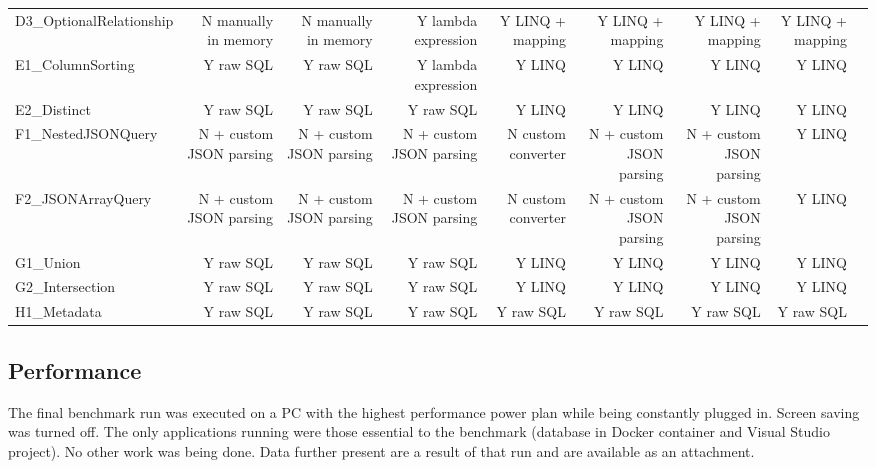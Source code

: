 \begin{landscape}
\begin{adjustwidth}{-2.5 cm}{-2.5 cm}
\begin{threeparttable}[!htb]
\begin{tabular}{lrrrrrrrr}
D3\_OptionalRelationship &\cellcolor[HTML]{f4cccc}N manually in memory &\cellcolor[HTML]{f4cccc}N manually in memory &\cellcolor[HTML]{d9ead3}Y lambda expression &\cellcolor[HTML]{b7e1cd}Y LINQ + mapping &\cellcolor[HTML]{b7e1cd}Y LINQ + mapping &\cellcolor[HTML]{b7e1cd}Y LINQ + mapping &\cellcolor[HTML]{b7e1cd}Y LINQ + mapping \\
E1\_ColumnSorting &Y raw SQL &Y raw SQL &\cellcolor[HTML]{d9ead3}Y lambda expression &\cellcolor[HTML]{b7e1cd}Y LINQ &\cellcolor[HTML]{b7e1cd}Y LINQ &\cellcolor[HTML]{b7e1cd}Y LINQ &\cellcolor[HTML]{b7e1cd}Y LINQ \\
E2\_Distinct &Y raw SQL &Y raw SQL &Y raw SQL &\cellcolor[HTML]{b7e1cd}Y LINQ &\cellcolor[HTML]{b7e1cd}Y LINQ &\cellcolor[HTML]{b7e1cd}Y LINQ &\cellcolor[HTML]{b7e1cd}Y LINQ \\
F1\_NestedJSONQuery &\cellcolor[HTML]{f4cccc}N + custom JSON parsing &\cellcolor[HTML]{f4cccc}N + custom JSON parsing &\cellcolor[HTML]{f4cccc}N + custom JSON parsing &\cellcolor[HTML]{f4cccc}N custom converter &\cellcolor[HTML]{f4cccc}N + custom JSON parsing &\cellcolor[HTML]{f4cccc}N + custom JSON parsing &\cellcolor[HTML]{b7e1cd}Y LINQ \\
F2\_JSONArrayQuery &\cellcolor[HTML]{f4cccc}N + custom JSON parsing &\cellcolor[HTML]{f4cccc}N + custom JSON parsing &\cellcolor[HTML]{f4cccc}N + custom JSON parsing &\cellcolor[HTML]{f4cccc}N custom converter &\cellcolor[HTML]{f4cccc}N + custom JSON parsing &\cellcolor[HTML]{f4cccc}N + custom JSON parsing &\cellcolor[HTML]{b7e1cd}Y LINQ \\
G1\_Union &Y raw SQL &Y raw SQL &Y raw SQL &\cellcolor[HTML]{b7e1cd}Y LINQ &\cellcolor[HTML]{b7e1cd}Y LINQ &\cellcolor[HTML]{b7e1cd}Y LINQ &\cellcolor[HTML]{b7e1cd}Y LINQ \\
G2\_Intersection &Y raw SQL &Y raw SQL &Y raw SQL &\cellcolor[HTML]{b7e1cd}Y LINQ &\cellcolor[HTML]{b7e1cd}Y LINQ &\cellcolor[HTML]{b7e1cd}Y LINQ &\cellcolor[HTML]{b7e1cd}Y LINQ \\
H1\_Metadata &Y raw SQL &Y raw SQL &Y raw SQL &Y raw SQL &Y raw SQL &Y raw SQL &Y raw SQL \\
\bottomrule
\end{tabular}
\end{threeparttable}\end{adjustwidth}
\end{landscape}


\subsection{Performance}
The final benchmark run was executed on a PC with the highest performance power plan while being constantly plugged in. Screen saving was turned off. The only applications running were those essential to the benchmark (database in Docker container and Visual Studio project). No other work was being done. Data further present are a result of that run and are available as an attachment.

